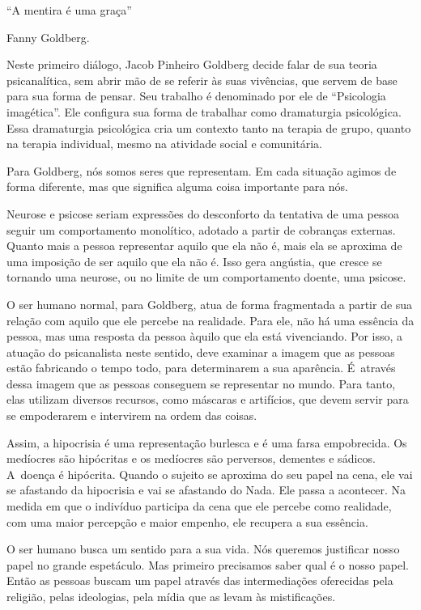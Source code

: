\newcommand\abrefala{\begingroup\parindent0pt \setlength{\parskip}{6pt plus 3pt}}
\newcommand\fechafala{\endgroup}

 \epigraph{``A mentira é uma graça''}{Fanny Goldberg.} 

 

Neste primeiro diálogo, Jacob Pinheiro Goldberg decide falar de sua
teoria psicanalítica, sem abrir mão de se referir às suas vivências, que
servem de base para sua forma de pensar. Seu trabalho é denominado por
ele de ``Psicologia imagética''. Ele configura sua forma de trabalhar como
dramaturgia psicológica. Essa dramaturgia psicológica cria um contexto
tanto na terapia de grupo, quanto na terapia individual, mesmo na
atividade social e comunitária.

Para Goldberg, nós somos seres que representam. Em cada situação agimos
de forma diferente, mas que significa alguma coisa importante para nós.

Neurose e psicose seriam expressões do desconforto da tentativa de uma
pessoa seguir um comportamento monolítico, adotado a partir de cobranças
externas. Quanto mais a pessoa representar aquilo que ela não é, mais
ela se aproxima de uma imposição de ser aquilo que ela não é. Isso gera
angústia, que cresce se tornando uma neurose, ou no limite de um
comportamento doente, uma psicose.

O ser humano normal, para Goldberg, atua de forma fragmentada a partir
de sua relação com aquilo que ele percebe na realidade. Para ele, não há
uma essência da pessoa, mas uma resposta da pessoa àquilo que ela está
vivenciando. Por isso, a atuação do psicanalista neste sentido, deve
examinar a imagem que as pessoas estão fabricando o tempo todo, para
determinarem a sua aparência. É~através dessa imagem que as pessoas
conseguem se representar no mundo. Para tanto, elas utilizam diversos
recursos, como máscaras e artifícios, que devem servir para se
empoderarem e intervirem na ordem das coisas.

Assim, a hipocrisia é uma representação burlesca e é uma farsa
empobrecida. Os medíocres são hipócritas e os medíocres são perversos,
dementes e sádicos. A~doença é hipócrita. Quando o sujeito se aproxima
do seu papel na cena, ele vai se afastando da hipocrisia e vai se
afastando do Nada. Ele passa a acontecer. Na medida em que o indivíduo
participa da cena que ele percebe como realidade, com uma maior
percepção e maior empenho, ele recupera a sua essência.

O ser humano busca um sentido para a sua vida. Nós queremos justificar
nosso papel no grande espetáculo. Mas primeiro precisamos saber qual é o
nosso papel. Então as pessoas buscam um papel através das intermediações
oferecidas pela religião, pelas ideologias, pela mídia que as levam às
mistificações.

